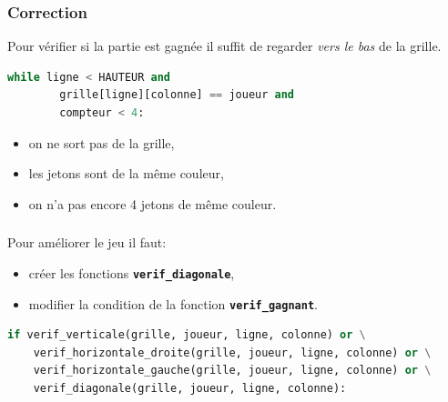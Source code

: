 \documentclass[svgnames,11pt]{beamer}
\begin{document}
\begin{frame}[fragile]
    \frametitle{Correction}
\begin{aretenir}[Remarque]
Pour vérifier si la partie est gagnée il suffit de regarder \emph{vers le bas} de la grille.
\end{aretenir}
    \begin{center}
    \begin{lstlisting}[language=Python , basicstyle=\ttfamily\small, xleftmargin=2em, xrightmargin=2em]
while ligne < HAUTEUR and 
        grille[ligne][colonne] == joueur and 
        compteur < 4:
\end{lstlisting}
    \end{center}
\begin{itemize}
    \item on ne sort pas de la grille,
    \item les jetons sont de la même couleur,
    \item on n'a pas encore 4 jetons de même couleur.
\end{itemize}
\end{frame}
\begin{frame}[fragile]
    \frametitle{}

    Pour améliorer le jeu il faut:
    \begin{itemize}
        \item créer les fonctions \textbf{\texttt{verif\_diagonale}},
        \item modifier la condition de la fonction \textbf{\texttt{verif\_gagnant}}.
    \end{itemize}
    \begin{center}
    \begin{lstlisting}[language=Python , basicstyle=\ttfamily\small, xleftmargin=.5em, xrightmargin=-1.5em]
if verif_verticale(grille, joueur, ligne, colonne) or \
    verif_horizontale_droite(grille, joueur, ligne, colonne) or \
    verif_horizontale_gauche(grille, joueur, ligne, colonne) or \
    verif_diagonale(grille, joueur, ligne, colonne):
\end{lstlisting}
        \end{center}
\end{frame}
\end{document}
